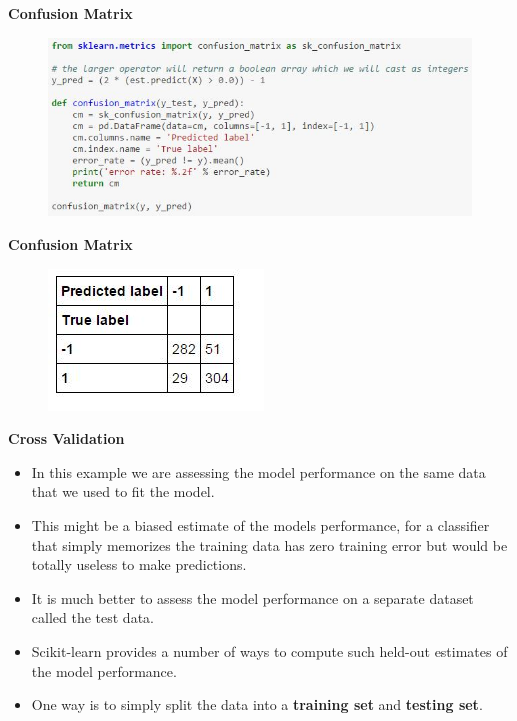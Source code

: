 \documentclass[MASTER.tex]{subfiles}
\begin{document}
\begin{frame}
\textbf{Confusion Matrix}\begin{figure}
\centering
\includegraphics[width=0.95\linewidth]{sklcass/sklclass8}

\end{figure}
\end{frame}
\begin{frame}
\textbf{Confusion Matrix}
\begin{figure}
\centering
\includegraphics[width=0.7\linewidth]{sklcass/sklclass9}

\end{figure}


\end{frame}
\begin{frame}
	\large
	\textbf{Cross Validation}
\begin{itemize}
\item In this example we are assessing the model performance on the same data that we used to fit the model. 
\item This might be a biased estimate of the models performance, for a classifier that simply memorizes the training data has zero training error but would be totally useless to make predictions.
\item  It is much better to assess the model performance on a separate dataset called the test data.
\item  Scikit-learn provides a number of ways to compute such held-out estimates of the model performance. \item One way is to simply split the data into a \textbf{training set} and \textbf{testing set}.
\end{itemize}

\end{frame}
\end{document}
